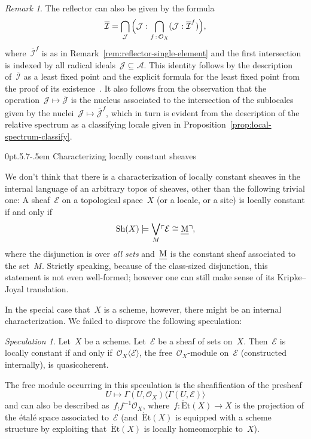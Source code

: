 \documentclass[10pt,reqno,a4paper]{amsbook}
\makeatletter
\theoremstyle{definition}
\theoremstyle{plain}
\theoremstyle{remark}
\newtheorem{rem}[defn]{Remark}
\newtheorem{speculation}[defn]{Speculation}
\newcommand{\A}{\mathcal{A}}
\newcommand{\E}{\mathcal{E}}
\renewcommand{\O}{\mathcal{O}}
\newcommand{\I}{\mathcal{I}}
\newcommand{\J}{\mathcal{J}}
\let\oldul\ul
\renewcommand{\ul}[1]{\text{\oldul{$#1$}}}
\newcommand{\Sh}{\mathrm{Sh}}
\newcommand{\?}{\,{:}\,}
\renewcommand{\_}{\mathpunct{.}\,}
\newcommand{\speak}[1]{\ulcorner\text{\textnormal{#1}}\urcorner}
\def\subsection{\@startsection{subsection}{2}%
  {0pt}{.5\linespacing\@plus.7\linespacing}{-.5em}%
  {\normalfont\bfseries}}
\makeatother
\begin{document}
\begin{rem}The reflector can also be given by the formula
\[ \overline{\I} = \bigcap_\J\,
  \Bigl(\J : \bigcap_{f\?\O_X} (\J : \overline{\I}^f)\Bigr), \]
where~$\overline{\I}^f$ is as in Remark~\ref{rem:reflector-single-element} and
the first intersection is indexed by all radical ideals~$\J \subseteq \A$.
This identity follows by the description of~$\overline{\I}$ as a least fixed
point and the explicit formula for the least fixed point from the proof of its
existence~\cite{bauer:lumsdaine:bourbaki-witt}. It also follows from the
observation that the operation~$\J \mapsto \overline{\J}$ is the nucleus
associated to the intersection of the sublocales given by the nuclei~$\J
\mapsto \overline{\J}^f$, which in turn is evident from the description of the
relative spectrum as a classifying locale given in
Proposition~\ref{prop:local-spectrum-classify}.
\end{rem}


\subsection{Characterizing locally constant sheaves}
\label{sect:lc-sheaves}

We don't think that there is a characterization of locally constant
sheaves in the internal language of an arbitrary topos of sheaves, other than
the following trivial one: A sheaf~$\E$ on a topological space~$X$ (or a locale,
or a site) is locally constant if and only if
\[ \Sh(X) \models \bigvee_M \speak{$\E \cong \ul{M}$}, \]
where the disjunction is over \emph{all sets} and~$\ul{M}$ is the constant
sheaf associated to the set~$M$. Strictly speaking, because of the class-sized
disjunction, this statement is not even well-formed; however one can still make
sense of its Kripke--Joyal translation.

In the special case that~$X$ is a scheme, however, there might be an internal
characterization. We failed to disprove the following speculation:

\begin{speculation}\label{speculation:lc-quasicoherent}
Let~$X$ be a scheme. Let~$\E$ be a sheaf of sets on~$X$.
Then~$\E$ is locally constant if and only if~$\O_X\langle\E\rangle$, the
free~$\O_X$-module on~$\E$ (constructed internally), is quasicoherent.
\end{speculation}

The free module occurring in this speculation is the sheafification of the
presheaf
\[ U \longmapsto \Gamma(U, \O_X)\langle\Gamma(U, \E)\rangle \]
and can also be described as~$f_! f^{-1} \O_X$, where~$f : \operatorname{\acute
Et}(X)
\to X$ is the projection of the étalé space associated to~$\E$
(and~$\operatorname{\acute Et}(X)$ is equipped with a scheme structure by exploiting
that~$\operatorname{\acute Et}(X)$ is locally homeomorphic to~$X$).
\end{document}
